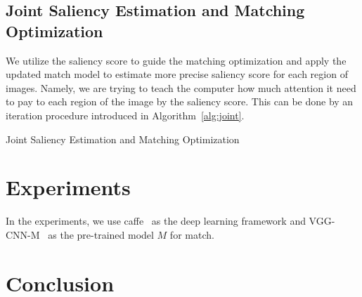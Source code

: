 \subsection{Joint Saliency Estimation and Matching Optimization}
\par
We utilize the saliency score to guide the matching optimization and apply the updated match model to estimate more precise saliency score for each region of images. Namely, we are trying to teach the computer how much attention it need to pay to each region of the image by the saliency score. This can be done by an iteration procedure introduced in Algorithm~\ref{alg:joint}.
\begin{algorithm}
\caption{Joint Saliency Estimation and Matching Optimization}
\label{alg:joint}
\begin{algorithmic}  
\ENDFOR
{}
\ENDFOR
{}
\ENDFOR
\end{algorithmic}
\end{algorithm}

\section{Experiments}
\par
In the experiments, we use caffe~\cite{jia2014caffe} as the deep learning framework and VGG-CNN-M~\cite{chatfield2014return} as the pre-trained model $M$ for match. 

\section{Conclusion}
